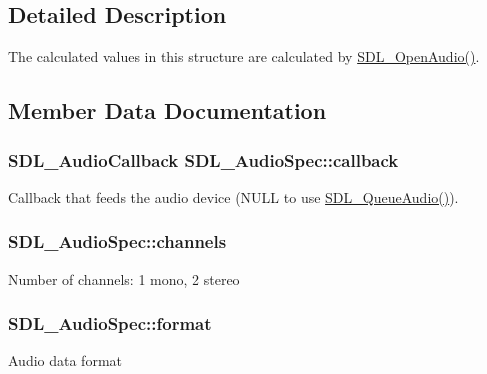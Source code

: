 \subsection{Detailed Description}
The calculated values in this structure are calculated by \hyperlink{_s_d_l__audio_8h_a2edf30e7747584e28041b4986f89f440}{S\+D\+L\+\_\+\+Open\+Audio()}. 

\subsection{Member Data Documentation}
\subsubsection[{\texorpdfstring{callback}{callback}}]{\setlength{\rightskip}{0pt plus 5cm}S\+D\+L\+\_\+\+Audio\+Callback S\+D\+L\+\_\+\+Audio\+Spec\+::callback}\hypertarget{struct_s_d_l___audio_spec_a1f8d05139f1679dcf359f49251233eac}{}\label{struct_s_d_l___audio_spec_a1f8d05139f1679dcf359f49251233eac}
Callback that feeds the audio device (N\+U\+LL to use \hyperlink{_s_d_l__audio_8h_a19ef6fa2396f581aaf4d9a9512972268}{S\+D\+L\+\_\+\+Queue\+Audio()}). 
\subsubsection[{\texorpdfstring{channels}{channels}}]{ S\+D\+L\+\_\+\+Audio\+Spec\+::channels}\hypertarget{struct_s_d_l___audio_spec_a31fe8b3710cf23bbef24be8a1749fe46}{}\label{struct_s_d_l___audio_spec_a31fe8b3710cf23bbef24be8a1749fe46}
Number of channels\+: 1 mono, 2 stereo 
\subsubsection[{\texorpdfstring{format}{format}}]{ S\+D\+L\+\_\+\+Audio\+Spec\+::format}\hypertarget{struct_s_d_l___audio_spec_ae37c634cac5807762f184c8d5d49fc2d}{}\label{struct_s_d_l___audio_spec_ae37c634cac5807762f184c8d5d49fc2d}
Audio data format 

